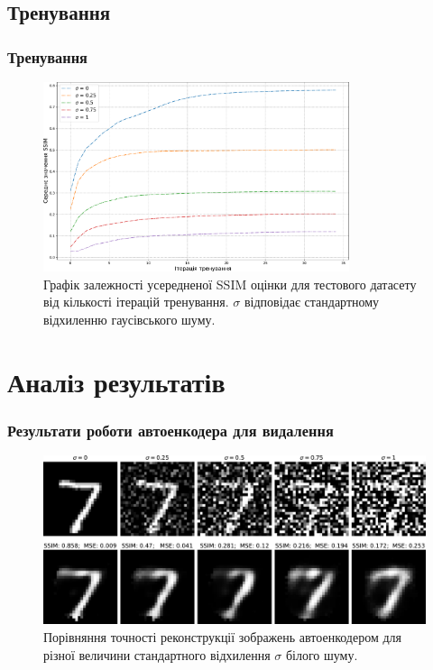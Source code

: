\documentclass{beamer}
\numberwithin{equation}{section}
\newcounter{e}
\numberwithin{equation}{section}
\numberwithin{figure}{section}
\begin{document}
	\subsection{Тренування}
	\begin{frame}
		\frametitle{Тренування}
		
		\begin{figure}[H]
			\centering
			\includegraphics[width=0.8\textwidth]{../resources/awgn-train-ssim-comparation.pdf}
			\caption{Графік залежності усередненої SSIM оцінки для тестового датасету від кількості ітерацій тренування. $\sigma$ відповідає стандартному відхиленню гаусівського шуму.}
			\label{fig:awgn-train-ssim-comparation}
		\end{figure}
	\end{frame}

	\section{Аналіз результатів}
		
	\begin{frame}
		\frametitle{Результати роботи автоенкодера для видалення}
		
		\begin{figure}[H]
			\centering
			\includegraphics[width=1\textwidth]{../resources/denoising-awgn-comparation.pdf}
			\caption{Порівняння точності реконструкції зображень автоенкодером для різної величини стандартного відхилення $\sigma$ білого шуму.}
			\label{fig:denoising-awgn-comparation}
		\end{figure}
	\end{frame}
\end{document}
